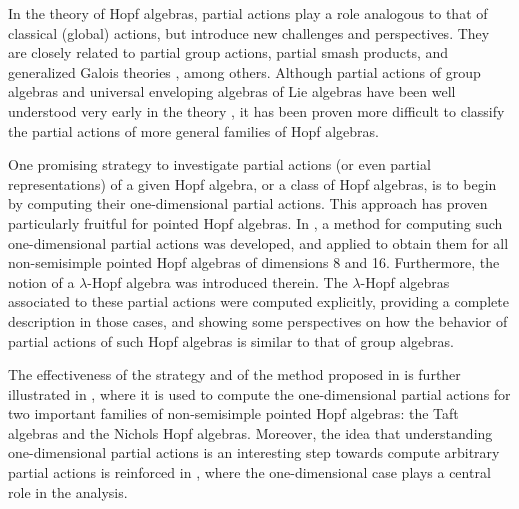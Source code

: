 \documentclass[reqno]{amsart}
\theoremstyle{definition}
\numberwithin{equation}{section}\theoremstyle{plain}
\theoremstyle{definition}
\begin{document}
In the theory of Hopf algebras, partial actions play a role analogous to that of classical (global) actions, but introduce new challenges and perspectives.
They are closely related to partial group actions, partial smash products, and generalized Galois theories \cites{caenepeel2008partial, paques_ferrero_dokuchaev}, among others.
Although partial actions of group algebras and universal enveloping algebras of Lie algebras have been well understood very early in the theory \cites{Alvares_Alves_Batista, caenepeel2008partial, Dokuchaev_exel, paques_ferrero_dokuchaev}, it has been proven more difficult to classify the partial actions of more general families of Hopf algebras.

One promising strategy to investigate partial actions (or even partial representations) of a given Hopf algebra, or a class of Hopf algebras, is to begin by computing their one-dimensional partial actions.
This approach has proven particularly fruitful for pointed Hopf algebras.
In \cite{corresponding}, a method for computing such one-dimensional partial actions was developed, and applied to obtain them for all non-semisimple pointed Hopf algebras of dimensions 8 and 16.
Furthermore, the notion of a $\lambda$-Hopf algebra was introduced therein.
The $\lambda$-Hopf algebras associated to these partial actions were computed explicitly, providing a complete description in those cases, and showing some perspectives on how the behavior of partial actions of such Hopf algebras is similar to that of group algebras.

The effectiveness of the strategy and of the method proposed in \cite{corresponding} is further illustrated in \cite{FMS}, where it is used to compute the one-dimensional partial actions for two important families of non-semisimple pointed Hopf algebras: the Taft algebras and the Nichols Hopf algebras. 
Moreover, the idea that understanding one-dimensional partial actions is an interesting step towards compute arbitrary partial actions is reinforced in \cites{Arthur, Ore, FMS2}, where the one-dimensional case plays a central role in the analysis.

\medbreak
\end{document}
